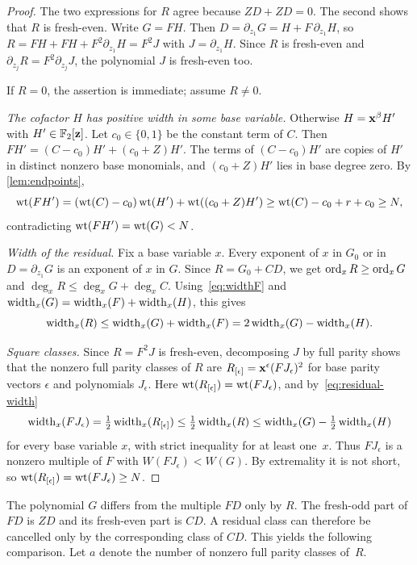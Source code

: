 \begin{proof}
The two expressions for $R$ agree because $ZD+ZD=0$. The second shows that $R$ is fresh-even. Write $G=FH$. Then $D=\partial_{z_1}G=H+F\,\partial_{z_1}H$, so $R=FH+FH+F^2\partial_{z_1}H=F^2J$ with $J=\partial_{z_1}H$. Since $R$ is fresh-even and $\partial_{z_j}R=F^2\partial_{z_j}J$, the polynomial $J$ is fresh-even too.

If $R=0$, the assertion is immediate; assume $R\ne0$.

\emph{The cofactor $H$ has positive width in some base variable.} Otherwise $H=\mathbf{x}^\beta H'$ with $H'\in\mathbb{F}_2[\mathbf{z}]$. Let $c_0\in\{0,1\}$ be the constant term of $C$. Then $FH'=(C-c_0)H'+(c_0+Z)H'$. The terms of $(C-c_0)H'$ are copies of $H'$ in distinct nonzero base monomials, and $(c_0+Z)H'$ lies in base degree zero. By \cref{lem:endpoints},
\[
 \operatorname{wt}(FH')=(\operatorname{wt}(C)-c_0)\operatorname{wt}(H')+\operatorname{wt}((c_0+Z)H')\ge \operatorname{wt}(C)-c_0+r+c_0\ge N,
\]
contradicting $\operatorname{wt}(FH')=\operatorname{wt}(G)<N$.

\emph{Width of the residual.} Fix a base variable $x$. Every exponent of $x$ in $G_0$ or in $D=\partial_{z_1}G$ is an exponent of $x$ in $G$. Since $R=G_0+CD$, we get $\operatorname{ord}_xR\ge\operatorname{ord}_xG$ and $\deg_xR\le\deg_xG+\deg_xC$. Using~\eqref{eq:widthF} and $\operatorname{width}_x(G)=\operatorname{width}_x(F)+\operatorname{width}_x(H)$, this gives
\begin{equation}\label{eq:residual-width}
 \operatorname{width}_x(R)\le\operatorname{width}_x(G)+\operatorname{width}_x(F)=2\operatorname{width}_x(G)-\operatorname{width}_x(H).
\end{equation}

\emph{Square classes.} Since $R=F^2J$ is fresh-even, decomposing $J$ by full parity shows that the nonzero full parity classes of $R$ are $R_{[\epsilon]}=\mathbf{x}^\epsilon(FJ_\epsilon)^2$ for base parity vectors $\epsilon$ and polynomials $J_\epsilon$. Here $\operatorname{wt}(R_{[\epsilon]})=\operatorname{wt}(FJ_\epsilon)$, and by~\eqref{eq:residual-width}
\[
 \operatorname{width}_x(FJ_\epsilon)=\tfrac12\operatorname{width}_x(R_{[\epsilon]})\le\tfrac12\operatorname{width}_x(R)\le\operatorname{width}_x(G)-\tfrac12\operatorname{width}_x(H)
\]
for every base variable $x$, with strict inequality for at least one~$x$. Thus $FJ_\epsilon$ is a nonzero multiple of $F$ with $W(FJ_\epsilon)<W(G)$. By extremality it is not short, so $\operatorname{wt}(R_{[\epsilon]})=\operatorname{wt}(FJ_\epsilon)\ge N$.
\end{proof}

The polynomial $G$ differs from the multiple $FD$ only by $R$. The fresh-odd part of $FD$ is $ZD$ and its fresh-even part is $CD$. A residual class can therefore be cancelled only by the corresponding class of $CD$. This yields the following comparison. Let $a$ denote the number of nonzero full parity classes of~$R$.

